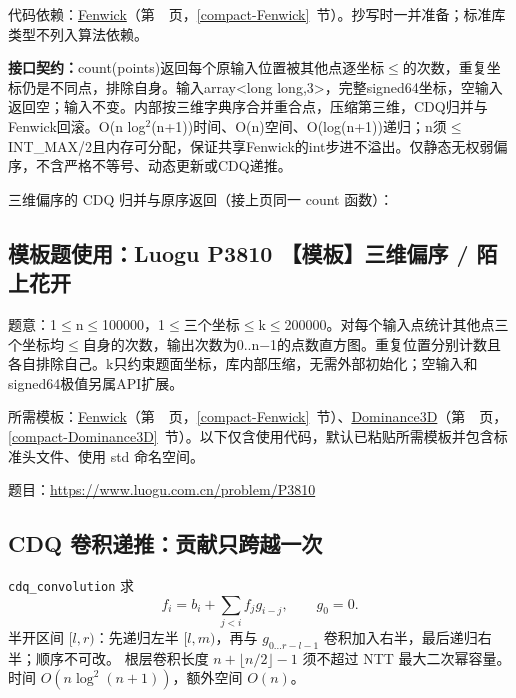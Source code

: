 代码依赖：\hyperref[compact-Fenwick]{Fenwick}（第~\pageref{compact-Fenwick}~页，\ref{compact-Fenwick}~节）。抄写时一并准备；标准库类型不列入算法依赖。

{\sloppy{}\noindent\textbf{接口契约：}count(points)返回每个原输入位置被其他点逐坐标$\le$的次数，重复坐标仍是不同点，排除自身。输入array<long long,3>，完整signed64坐标，空输入返回空；输入不变。内部按三维字典序合并重合点，压缩第三维，CDQ归并与Fenwick回滚。O(n log$^{2}$(n+1))时间、O(n)空间、O(log(n+1))递归；n须$\le$INT\_MAX/2且内存可分配，保证共享Fenwick的int步进不溢出。仅静态无权弱偏序，不含严格不等号、动态更新或CDQ递推。\par}

\Needspace{506pt}



\newpage

\noindent 三维偏序的 CDQ 归并与原序返回（接上页同一 count 函数）：



\Needspace{315pt}

\subsection*{模板题使用：Luogu P3810 【模板】三维偏序 / 陌上花开}

\label{usage-example-237}

题意：1$\le$n$\le$100000，1$\le$三个坐标$\le$k$\le$200000。对每个输入点统计其他点三个坐标均$\le$自身的次数，输出次数为0..n−1的点数直方图。重复位置分别计数且各自排除自己。k只约束题面坐标，库内部压缩，无需外部初始化；空输入和signed64极值另属API扩展。

所需模板：\hyperref[compact-Fenwick]{Fenwick}（第~\pageref{compact-Fenwick}~页，\ref{compact-Fenwick}~节）、\hyperref[compact-Dominance3D]{Dominance3D}（第~\pageref{compact-Dominance3D}~页，\ref{compact-Dominance3D}~节）。以下仅含使用代码，默认已粘贴所需模板并包含标准头文件、使用 std 命名空间。

题目：\url{https://www.luogu.com.cn/problem/P3810}



\subsection{CDQ 卷积递推：贡献只跨越一次}\label{knowledge-cdq-conv}
\texttt{cdq\_convolution} 求
\[
f_i=b_i+\sum_{j<i}f_j g_{i-j},\qquad g_0=0.
\]
半开区间 $[l,r)$：先递归左半 $[l,m)$，再与 $g_{0\ldots r-l-1}$ 卷积加入右半，最后递归右半；顺序不可改。
根层卷积长度 $n+\lfloor n/2\rfloor-1$ 须不超过 NTT 最大二次幂容量。
时间 $O(n\log^2(n+1))$，额外空间 $O(n)$。



